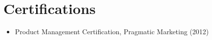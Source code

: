 \section{Certifications}
\vspace{0.5em}

\begin{itemize}
  \item Product Management Certification, Pragmatic Marketing (2012)
\end{itemize}
